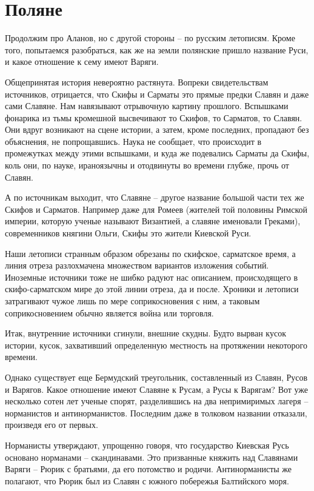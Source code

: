 \chapter{Поляне}

Продолжим про Аланов, но с другой стороны – по русским летописям. Кроме того, попытаемся разобраться, как же на земли полянские пришло название Руси, и какое отношение к сему имеют Варяги.

Общепринятая история невероятно растянута. Вопреки свидетельствам источников, отрицается, что Скифы и Сарматы это прямые предки Славян и даже сами Славяне. Нам навязывают отрывочную картину прошлого. Вспышками фонарика из тьмы кромешной высвечивают то Скифов, то Сарматов, то Славян. Они вдруг возникают на сцене истории, а затем, кроме последних, пропадают без объяснения, не попрощавшись. Наука не сообщает, что происходит в промежутках между этими вспышками, и куда же подевались Сарматы да Скифы, коль они, по науке, ираноязычны и отодвинуты во времени глубже, прочь от Славян.

А по источникам выходит, что Славяне – другое название большой части тех же Скифов и Сарматов. Например даже для Ромеев (жителей той половины Римской империи, которую ученые называют Византией, а славяне именовали Греками), современников княгини Ольги, Скифы это жители Киевской Руси.

Наши летописи странным образом обрезаны по  скифское, сарматское время, а линия отреза разлохмачена множеством вариантов изложения событий. Иноземные источники тоже не шибко радуют нас описанием, происходящего в скифо-сарматском мире до этой линии отреза, да и после. Хроники и летописи затрагивают чужое лишь по мере соприкосновения с ним, а таковым соприкосновением обычно является война или торговля.

Итак, внутренние источники сгинули, внешние скудны. Будто вырван кусок истории, кусок, захвативший определенную местность на протяжении некоторого времени.

Однако существует еще Бермудский треугольник, составленный из Славян, Русов и Варягов. Какое отношение имеют Славяне к Русам, а Русы к Варягам? Вот уже несколько сотен лет ученые спорят, разделившись на два непримиримых лагеря – норманистов и антинорманистов. Последним даже в толковом названии отказали, произведя его от первых.

Норманисты утверждают, упрощенно говоря, что государство Киевская Русь основано норманами – скандинавами. Это призванные княжить над Славянами Варяги – Рюрик с братьями, да его потомство и родичи. Антинорманисты же полагают, что Рюрик был из Славян с южного побережья Балтийского моря.

